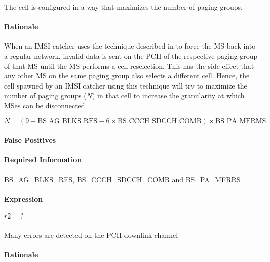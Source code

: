 \documentclass[a4paper,11pt,notitlepage,bigheadings,oneside]{scrartcl}
\begin{document}
The cell is configured in a way that maximizes the number of paging groups.

\paragraph{Rationale}

When an IMSI catcher uses the technique described in
\cite[0021]{bott2000verfahren} to force the MS back into a regular network,
invalid data is sent on the PCH of the respective paging group of that MS until
the MS performs a cell reselection. This has the side effect that any other MS
on the same paging group also selects a different cell. Hence, the cell spawned
by an IMSI catcher using this technique will try to maximize the number of
paging groups ($N$) in that cell to increase the granularity at which MSes can
be disconnected.

${N} = (9 - {\text{BS\_AG\_BLKS\_RES}} - 6\times {\text{BS\_CCCH\_SDCCH\_COMB}})\times {\text{BS\_PA\_MFRMS}}$

\paragraph{False Positives}


\paragraph{Required Information}

BS\_AG\_BLKS\_RES, BS\_CCCH\_SDCCH\_COMB and BS\_PA\_MFRRS


\paragraph{Expression}

$r2 = ?$

\subsubsection{}

Many errors are detected on the PCH downlink channel

\paragraph{Rationale}
\end{document}
